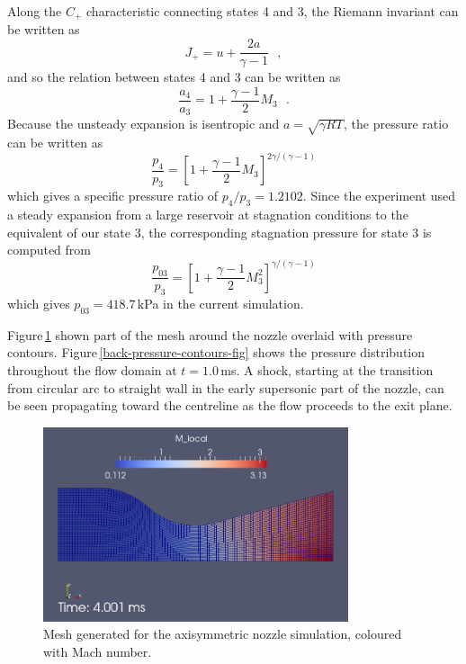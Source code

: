 Along the $C_+$ characteristic connecting states 4 and 3, 
the Riemann invariant can be written as 
$$
    J_+ = u + \frac{2 a}{\gamma - 1} ~~~,
$$
and so the relation between states 4 and 3 can be written as
$$
    \frac{a_4}{a_3} = 1 + \frac{\gamma - 1}{2} M_3 ~~~.
$$
Because the unsteady expansion is isentropic and $a = \sqrt{\gamma R T}$,
the pressure ratio can be written as
$$
    \frac{p_4}{p_3} = \left[ 1 + \frac{\gamma - 1}{2} M_3 
                      \right]^{2 \gamma / (\gamma - 1)}
$$
which gives a specific pressure ratio of $p_4/p_3 = 1.2102$.
Since the experiment used a steady expansion from a large reservoir
at stagnation conditions to the equivalent of our state 3, 
the corresponding stagnation pressure for state 3 is computed from
$$
    \frac{p_{03}}{p_3} = \left[ 1 + \frac{\gamma - 1}{2} M_3^2
                               \right]^{\gamma / (\gamma - 1)} 
$$
which gives $p_{03} = 418.7$\,kPa in the current simulation.

Figure\,\ref{back-mesh-fig} shown part of the mesh around the nozzle
overlaid with pressure contours.
Figure\,\ref{back-pressure-contours-fig} shows the pressure distribution
throughout the flow domain at $t = 1.0$\,ms.
A shock, starting at the transition from circular arc to straight wall
in the early supersonic part of the nozzle, can be seen propagating
toward the centreline as the flow proceeds to the exit plane.

\begin{figure}[htbp]
\begin{center}
\includegraphics[width=0.8\textwidth]{../2D/back-nozzle/back-mach-field-with-mesh.png}
\end{center}
\caption{Mesh generated for the axisymmetric nozzle simulation, coloured with Mach number.}
\label{back-mesh-fig}
\end{figure}

